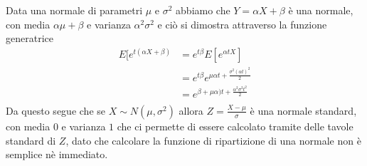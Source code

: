 \documentclass[a4paper,12pt, oneside]{book}
\begin{document}
Data una normale di parametri $\mu$ e $\sigma^2$ abbiamo che $Y = \alpha X + \beta$ è una normale, con media $\alpha \mu + \beta$
e varianza $\alpha^2 \sigma^2$ e ciò si dimostra attraverso la funzione generatrice
\[ \begin{split}
    E[e^{t(\alpha X + \beta)} & = e^{t \beta} E[e^{\alpha tX}] \\
                              & = e^{t \beta} e^{\mu \alpha t + \frac{\sigma^2(\alpha t)^2}{2}}\\
                              & = e^{\beta + \mu \alpha)t + \frac{\alpha^2 \sigma^2 t^2}{2}}\\
    \end{split} \]
Da questo segue che se $X \sim N(\mu, \sigma^2)$ allora $Z = \frac{X - \mu}{\sigma}$ è una normale standard, 
con media $0$ e varianza $1$ che ci permette di essere calcolato tramite delle tavole standard di $Z$, 
dato che calcolare la funzione di ripartizione di una normale non è semplice nè immediato.
\end{document}
